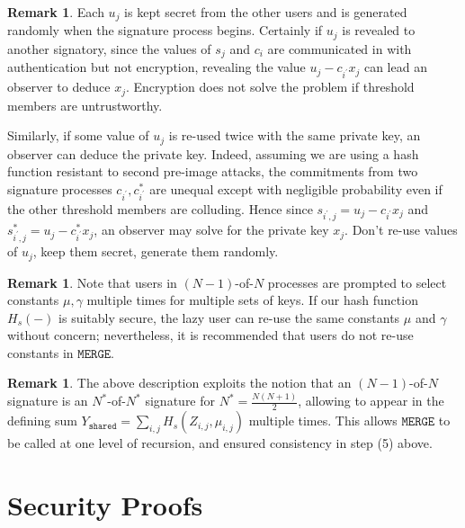 \documentclass[12pt,english,oneside]{mrl}
\theoremstyle{definition}
\newtheorem{Discussion}[lem]{Remark}
\newenvironment{disc}{\begin{Discussion}\rm}{\end{Discussion}}
\numberwithin{equation}{section}
\numberwithin{figure}{section}
\numberwithin{equation}{section}
\numberwithin{equation}{section}
\numberwithin{figure}{section}
\begin{document}
 \begin{disc}
 Each $u_j$ is kept secret from the other users and is generated randomly when the signature process begins. Certainly if $u_j$ is revealed to another signatory, since the values of $s_j$ and $c_i$ are communicated in with authentication but not encryption, revealing the value $u_j - c_{i^{\prime}} x_j$ can lead an observer to deduce $x_j$. Encryption does not solve the problem if threshold members are untrustworthy.
 
 
 Similarly, if some value of $u_j$ is re-used twice with the same private key, an observer can deduce the private key. Indeed, assuming we are using a hash function resistant to second pre-image attacks, the commitments from two signature processes $c_{i^{\prime}}, c_{i^{\prime}}^*$ are unequal except with negligible probability even if the other threshold members are colluding. Hence since $s_{i^{\prime},j} = u_j - c_{i^{\prime}} x_{j}$ and $s_{i^{\prime},j}^* = u_j - c_{i^{\prime}}^* x_{j}$, an observer may solve for the private key $x_j$. Don't re-use values of $u_j$, keep them secret, generate them randomly.
 
 \end{disc}
 
 \begin{disc}  Note that users in $(N-1)$-of-$N$ processes are prompted to select constants $\mu, \gamma$ multiple times for multiple sets of keys. If our hash function $H_s(-)$ is suitably secure, the lazy user can re-use the same constants $\mu$ and $\gamma$ without concern; nevertheless, it is recommended that users do not re-use constants in $\texttt{MERGE}$. 
 \end{disc}
 
 \begin{disc}
 The above description exploits the notion that an $(N-1)$-of-$N$ signature is an $N^*$-of-$N^*$ signature for $N^*=\frac{N(N+1)}{2}$, allowing to appear in the defining sum $Y_{\texttt{shared}} = \sum_{i,j} H_s (Z_{i,j}, \mu_{i,j})$ multiple times. This allows $\texttt{MERGE}$ to be called at one level of recursion, and ensured consistency in step (5) above.
 \end{disc}
 
 
 \section{Security Proofs}
 
\end{document}

